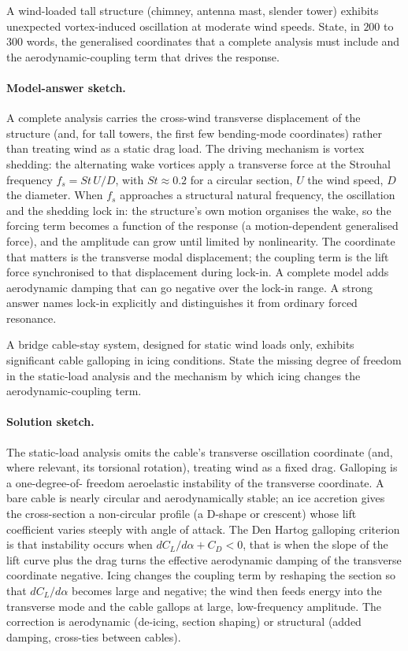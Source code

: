 \begin{exercise}
A wind-loaded tall structure (chimney, antenna mast, slender tower)
exhibits unexpected vortex-induced oscillation at moderate wind
speeds. State, in $200$ to $300$ words, the generalised coordinates
that a complete analysis must include and the aerodynamic-coupling
term that drives the response.

\paragraph{Model-answer sketch.} A complete analysis carries the
cross-wind transverse displacement of the structure (and, for tall
towers, the first few bending-mode coordinates) rather than treating
wind as a static drag load. The driving mechanism is vortex shedding:
the alternating wake vortices apply a transverse force at the Strouhal
frequency $f_s = St\,U/D$, with $St \approx 0.2$ for a circular section,
$U$ the wind speed, $D$ the diameter. When $f_s$ approaches a structural
natural frequency, the oscillation and the shedding lock in: the
structure's own motion organises the wake, so the forcing term becomes a
function of the response (a motion-dependent generalised force), and the
amplitude can grow until limited by nonlinearity. The coordinate that
matters is the transverse modal displacement; the coupling term is the
lift force synchronised to that displacement during lock-in. A complete
model adds aerodynamic damping that can go negative over the lock-in
range. A strong answer names lock-in explicitly and distinguishes it from
ordinary forced resonance.
\end{exercise}

\begin{exercise}
A bridge cable-stay system, designed for static wind loads only,
exhibits significant cable galloping in icing conditions. State the
missing degree of freedom in the static-load analysis and the
mechanism by which icing changes the aerodynamic-coupling term.

\paragraph{Solution sketch.} The static-load analysis omits the cable's
transverse oscillation coordinate (and, where relevant, its torsional
rotation), treating wind as a fixed drag. Galloping is a one-degree-of-
freedom aeroelastic instability of the transverse coordinate. A bare
cable is nearly circular and aerodynamically stable; an ice accretion
gives the cross-section a non-circular profile (a D-shape or crescent)
whose lift coefficient varies steeply with angle of attack. The Den
Hartog galloping criterion is that instability occurs when $dC_L/d\alpha
+ C_D < 0$, that is when the slope of the lift curve plus the drag turns
the effective aerodynamic damping of the transverse coordinate negative.
Icing changes the coupling term by reshaping the section so that
$dC_L/d\alpha$ becomes large and negative; the wind then feeds energy
into the transverse mode and the cable gallops at large, low-frequency
amplitude. The correction is aerodynamic (de-icing, section shaping) or
structural (added damping, cross-ties between cables).
\end{exercise}

